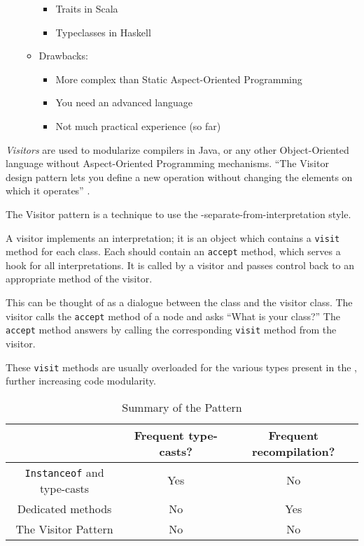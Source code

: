 \begin{enumerate}[noitemsep]
\begin{itemize}[noitemsep]
\begin{itemize}[noitemsep]
    \item Traits in Scala
    \item Typeclasses in Haskell
    \end{itemize}
  \item Drawbacks:
    \begin{itemize}[noitemsep]
    \item More complex than Static Aspect-Oriented Programming
    \item You need an advanced language
    \item Not much practical experience (so far)
    \end{itemize}
  \end{itemize}
\end{enumerate}

\begin{definition}[Visitors]\label{def:Visitors}
  \emph{Visitors} are used to modularize compilers in Java, or any other Object-Oriented language without Aspect-Oriented Programming mechanisms.
  ``The Visitor design pattern lets you define a new operation without changing the elements on which it operates'' \parencite{ElementsReusableObjectOrientedSoftware1994}.

  The Visitor pattern is a technique to use the -separate-from-interpretation style.

  A visitor implements an interpretation; it is an object which contains a \texttt{visit} method for each  class.
  Each  should contain an \texttt{accept} method, which serves a hook for all interpretations.
  It is called by a visitor and passes control back to an appropriate method of the visitor.

  This can be thought of as a dialogue between the  class and the visitor class.
  The visitor calls the \texttt{accept} method of a node and asks ``What is your class?''
  The \texttt{accept} method answers by calling the corresponding \texttt{visit} method from the visitor.

  These \texttt{visit} methods are usually overloaded for the various types present in the , further increasing code modularity.
\end{definition}

\begin{table}[h!]
  \centering
  \begin{tabular}{ccc}
    \toprule
    & Frequent type-casts? & Frequent recompilation? \\
    \midrule
    \texttt{Instanceof} and type-casts & Yes & No \\
    Dedicated methods & No & Yes \\
    The Visitor Pattern & No & No \\
    \bottomrule
  \end{tabular}
  \caption{Summary of the  Pattern}
  \label{tab:Visitor_Pattern_Summary}
\end{table}

